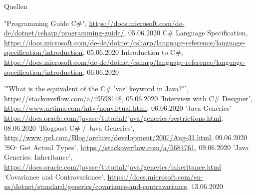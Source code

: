 \documentclass[11pt]{beamer}
\begin{document}
\begin{frame}{Quellen}
\begin{thebibliography}{99}
\fontsize{6pt}{7.2}\selectfont
	"Programming Guide C\#", \url{https://docs.microsoft.com/de-de/dotnet/csharp/programming-guide/}, 05.06.2020
	 C\# Language Specification, \url{https://docs.microsoft.com/de-de/dotnet/csharp/language-reference/language-specification/introduction}, 05.06.2020
   Introduction to C\#, \url{https://docs.microsoft.com/de-de/dotnet/csharp/language-reference/language-specification/introduction}, 06.06.2020

 '"What is the equivalent of the C\# 'var' keyword in Java?"', 
 \url{https://stackoverflow.com/a/49598148}, 05.06.2020
 'Interview with C\# Designer', \url{https://www.artima.com/intv/nonvirtual.html}, 06.06.2020
  'Java Generics' \url{https://docs.oracle.com/javase/tutorial/java/generics/restrictions.html}, 08.06.2020
  'Blogpost C\# / Java Generics', \url{http://www.jprl.com/Blog/archive/development/2007/Aug-31.html}, 09.06.2020
  'SO: Get Actual Types', \url{https://stackoverflow.com/a/5684761}, 09.06.2020
  'Java Generics: Inheritance', \url{https://docs.oracle.com/javase/tutorial/java/generics/inheritance.html}
  'Covariance and Contravariance', \url{https://docs.microsoft.com/en-us/dotnet/standard/generics/covariance-and-contravariance}, 13.06.2020

\end{thebibliography}
\end{frame}
\end{document}
